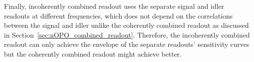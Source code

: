 Finally, incoherently combined readout uses the separate signal and idler readouts at different frequencies, which does not depend on the correlations between the signal and idler unlike the coherently combined readout as discussed in Section~\ref{sec:nOPO_combined_readout}. Therefore, the incoherently combined readout can only achieve the envelope of the separate readouts' sensitivity curves but the coherently combined readout might achieve better.



